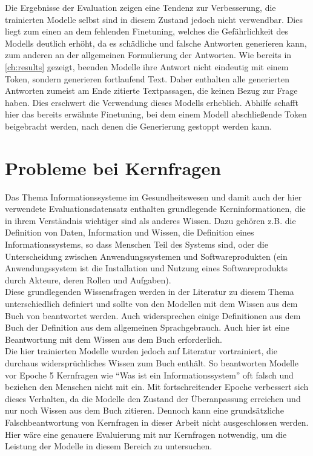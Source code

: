 Die Ergebnisse der Evaluation zeigen eine Tendenz zur Verbesserung, die trainierten Modelle selbst sind in diesem Zustand jedoch nicht verwendbar.
Dies liegt zum einen an dem fehlenden Finetuning, welches die Gefährlichkeit des Modells deutlich erhöht, da es schädliche und falsche Antworten generieren kann, zum anderen an der allgemeinen Formulierung der Antworten.
Wie bereits in \cref{ch:results} gezeigt, beenden Modelle ihre Antwort nicht eindeutig mit einem Token, sondern generieren fortlaufend Text.
Daher enthalten alle generierten Antworten zumeist am Ende zitierte Textpassagen, die keinen Bezug zur Frage haben.
Dies erschwert die Verwendung dieses Modells erheblich.
Abhilfe schafft hier das bereits erwähnte Finetuning, bei dem einem Modell abschließende Token beigebracht werden, nach denen die Generierung gestoppt werden kann.

\section{Probleme bei Kernfragen}
Das Thema Informationssysteme im Gesundheitswesen und damit auch der hier verwendete Evaluationsdatensatz enthalten grundlegende Kerninformationen,
die in ihrem Verständnis wichtiger sind als anderes Wissen. Dazu gehören z.B. die Definition von Daten, Information und Wissen, die Definition eines Informationssystems, so dass Menschen Teil des Systems sind, oder die Unterscheidung zwischen Anwendungssystemen und Softwareprodukten (ein Anwendungssystem ist die Installation und Nutzung eines Softwareprodukts durch Akteure, deren Rollen und Aufgaben).\\

Diese grundlegenden Wissensfragen werden in der Literatur zu diesem Thema unterschiedlich definiert und sollte von den Modellen mit dem Wissen aus dem Buch von \citet{bb} beantwortet werden.
Auch widersprechen einige Definitionen aus dem Buch der Definition aus dem allgemeinen Sprachgebrauch. Auch hier ist eine Beantwortung mit dem Wissen aus dem Buch erforderlich.\\

Die hier trainierten Modelle wurden jedoch auf Literatur vortrainiert, die durchaus widersprüchliches Wissen zum Buch enthält.
So beantworten Modelle vor Epoche 5 Kernfragen wie \enquote{Was ist ein Informationssystem} oft falsch und beziehen den Menschen nicht mit ein.
Mit fortschreitender Epoche verbessert sich dieses Verhalten, da die Modelle den Zustand der Überanpassung erreichen und nur noch Wissen aus dem Buch zitieren.
Dennoch kann eine grundsätzliche Falschbeantwortung von Kernfragen in dieser Arbeit nicht ausgeschlossen werden.
Hier wäre eine genauere Evaluierung mit nur Kernfragen notwendig, um die Leistung der Modelle in diesem Bereich zu untersuchen.\\


